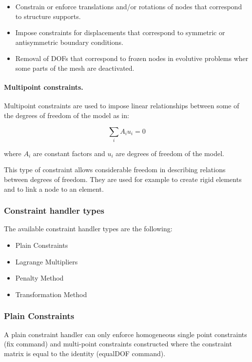 \begin{itemize}
  \item Constrain or enforce translations and/or rotations of nodes that correspond to structure supports.
  \item Impose constraints for displacements that correspond to symmetric or antisymmetric boundary conditions.
  \item Removal of DOFs that correspond to frozen nodes in evolutive problems wher some parts of the mesh are deactivated.
\end{itemize}

\paragraph{Multipoint constraints.}
Multipoint constraints are used to impose linear relationships between some of the degrees of freedom of the model as in:

\begin{equation}
  \sum_{i} A_i u_i= 0
\end{equation}

\noindent where $A_i$ are constant factors and $u_i$ are degrees of freedom of the model.

This type of constraint allows considerable freedom in describing relations between degrees of freedom. They are used for example to create rigid elements and to link a node to an element.

\subsubsection{Constraint handler types}

The available constraint handler types are the following:

\begin{itemize}
\item Plain Constraints
\item Lagrange Multipliers
\item Penalty Method
\item Transformation Method
\end{itemize}

\subsubsection{Plain Constraints}
A plain constraint handler can only enforce homogeneous single point constraints (fix command) and multi-point constraints constructed where the constraint matrix is equal to the identity (equalDOF command).

